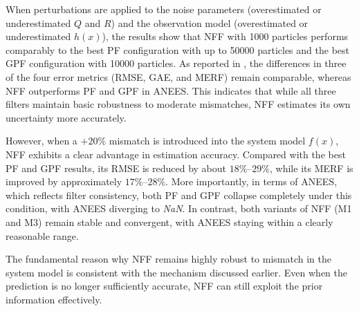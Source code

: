 When perturbations are applied to the noise parameters (overestimated or underestimated $Q$ and $R$) and the observation model (overestimated or underestimated $h(x)$), the results show that NFF with 1000 particles performs comparably to the best PF configuration with up to 50000 particles and the best GPF configuration with 10000 particles. As reported in , the differences in three of the four error metrics (RMSE, GAE, and MERF) remain comparable, whereas NFF outperforms PF and GPF in ANEES. This indicates that while all three filters maintain basic robustness to moderate mismatches, NFF estimates its own uncertainty more accurately.

However, when a $+20\%$ mismatch is introduced into the system model $f(x)$, NFF exhibits a clear advantage in estimation accuracy. Compared with the best PF and GPF results, its RMSE is reduced by about $18\%$--$29\%$, while its MERF is improved by approximately $17\%$--$28\%$. More importantly, in terms of ANEES, which reflects filter consistency, both PF and GPF collapse completely under this condition, with ANEES diverging to \textit{NaN}. In contrast, both variants of NFF (M1 and M3) remain stable and convergent, with ANEES staying within a clearly reasonable range.

The fundamental reason why NFF remains highly robust to mismatch in the system model is consistent with the mechanism discussed earlier. Even when the prediction is no longer sufficiently accurate, NFF can still exploit the prior information effectively.

